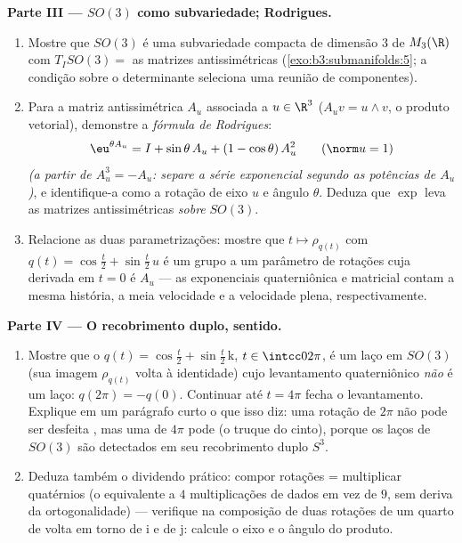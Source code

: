 \begin{problem}
\medskip
\noindent\textbf{Parte III --- $SO(3)$ como subvariedade;
Rodrigues.}
\begin{enumerate}[resume]
  \item Mostre que $SO(3)$ é uma subvariedade compacta de dimensão
        $3$ de $M_3(\R)$ com $T_ISO(3) =$ as matrizes antissimétricas
        (\cref{exo:b3:submanifolds:5}; a condição sobre o determinante seleciona uma
        reunião de componentes).
  \item Para a matriz antissimétrica $A_u$ associada a $u \in \R^3$ ($A_uv = u\wedge v$,
        o produto vetorial), demonstre a \emph{fórmula de Rodrigues}:
        \[
        \eu^{\theta A_u} = I + \sin\theta\,A_u + (1 -
        \cos\theta)\,A_u^2 \qquad (\norm u = 1)
        \]
        \emph{(a partir de $A_u^3 = -A_u$: separe a série exponencial segundo as
        potências de $A_u$)}, e identifique-a como a rotação de eixo
        $u$ e ângulo $\theta$. Deduza que $\exp$ leva as
        matrizes antissimétricas \emph{sobre} $SO(3)$.
  \item Relacione as duas parametrizações: mostre que $t
        \mapsto \rho_{q(t)}$ com $q(t) = \cos\frac t2 +
        \sin\frac t2\,u$ é
        um grupo a um parâmetro de rotações cuja derivada em $t = 0$
        é $A_u$ --- as exponenciais quaterniônica e matricial contam
        a mesma história, a meia velocidade e a velocidade plena,
        respectivamente.
\end{enumerate}

\medskip
\noindent\textbf{Parte IV --- O recobrimento duplo, sentido.}
\begin{enumerate}[resume]
  \item Mostre que o  $q(t) = \cos\frac t2 + \sin\frac
        t2\,\mathrm k$, $t \in \intcc0{2\pi}$, é um laço em $SO(3)$ (sua
        imagem $\rho_{q(t)}$ volta à identidade) cujo levantamento quaterniônico
        \emph{não} é um laço: $q(2\pi) = -q(0)$. Continuar até $t = 4\pi$ fecha o
        levantamento. Explique em um parágrafo curto o que isso diz: uma
        rotação de $2\pi$ não pode ser desfeita , mas
        uma de $4\pi$ pode (o truque do cinto), porque os laços de
        $SO(3)$ são detectados em seu recobrimento duplo $S^3$.
  \item Deduza também o dividendo prático: compor rotações =
        multiplicar quatérnios (o equivalente a $4$ multiplicações de
        dados em vez de $9$, sem deriva da ortogonalidade) ---
        verifique na composição de duas rotações de um quarto de volta
        em torno de $\mathrm i$ e de $\mathrm j$: calcule o eixo e o ângulo do
        produto.
\end{enumerate}


\end{problem}
